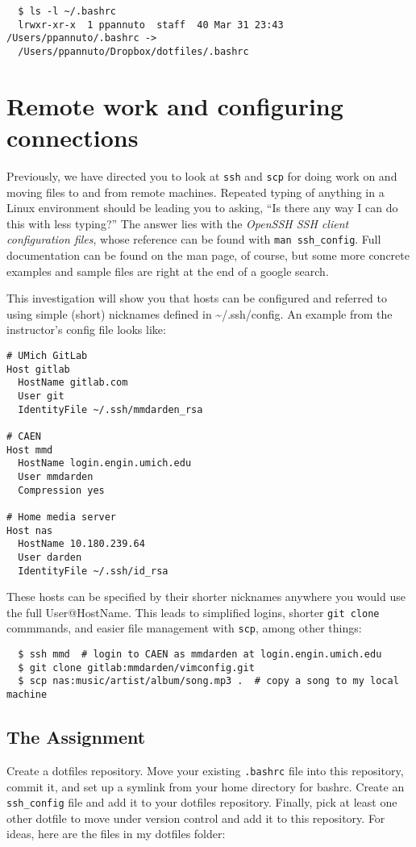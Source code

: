 \documentclass{article}
\begin{document}
\begin{lstlisting}
  $ ls -l ~/.bashrc
  lrwxr-xr-x  1 ppannuto  staff  40 Mar 31 23:43 /Users/ppannuto/.bashrc ->
  /Users/ppannuto/Dropbox/dotfiles/.bashrc
\end{lstlisting}


\section{Remote work and configuring connections}
Previously, we have directed you to look at \texttt{ssh} and \texttt{scp}
for doing work on and moving files to and from remote machines. Repeated
typing of anything in a Linux environment should be leading you to asking,
``Is there any way I can do this with less typing?'' The answer lies with the
\emph{OpenSSH SSH client configuration files}, whose reference can be found
with \texttt{man ssh\_config}. Full documentation can be found on the man
page, of course, but some more concrete examples and sample files are right
at the end of a google search.

This investigation will show you that hosts can be configured and referred to
using simple (short) nicknames defined in \textasciitilde/.ssh/config. An
example from the instructor's config file looks like:

\begin{lstlisting}
# UMich GitLab
Host gitlab
  HostName gitlab.com
  User git
  IdentityFile ~/.ssh/mmdarden_rsa

# CAEN
Host mmd
  HostName login.engin.umich.edu
  User mmdarden
  Compression yes
  
# Home media server
Host nas
  HostName 10.180.239.64
  User darden
  IdentityFile ~/.ssh/id_rsa
\end{lstlisting}

These hosts can be specified by their shorter nicknames anywhere you would
use the full User@HostName. This leads to simplified logins, shorter
\texttt{git clone} commmands, and easier file management with \texttt{scp},
among other things:

\begin{lstlisting}
  $ ssh mmd  # login to CAEN as mmdarden at login.engin.umich.edu
  $ git clone gitlab:mmdarden/vimconfig.git
  $ scp nas:music/artist/album/song.mp3 .  # copy a song to my local machine
\end{lstlisting}
  

\subsection*{The Assignment}
Create a dotfiles repository. Move your existing \texttt{.bashrc} file into
this repository, commit it, and set up a symlink from your home directory for
bashrc. Create an \texttt{ssh\_config} file and add it to your dotfiles
repository. Finally, pick at least one other dotfile to move under version
control and add it to this repository. For ideas, here are the files in my
dotfiles folder:
\end{document}
